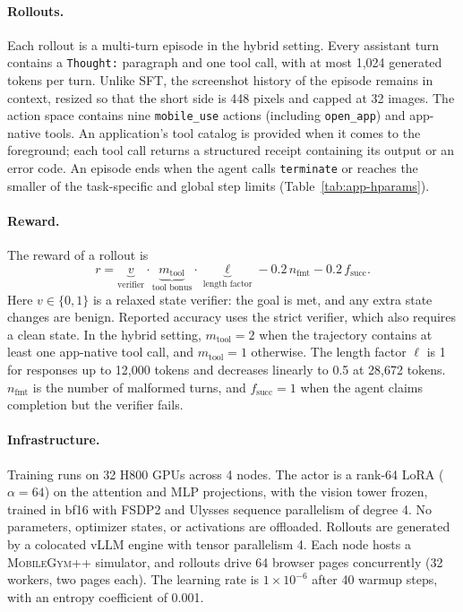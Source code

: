\paragraph{Rollouts.}
Each rollout is a multi-turn episode in the hybrid setting. Every assistant turn contains a \texttt{Thought:} paragraph and one tool call, with at most 1,024 generated tokens per turn. Unlike SFT, the screenshot history of the episode remains in context, resized so that the short side is 448 pixels and capped at 32 images. The action space contains nine \texttt{mobile\_use} actions (including \texttt{open\_app}) and app-native tools. An application's tool catalog is provided when it comes to the foreground; each tool call returns a structured receipt containing its output or an error code. An episode ends when the agent calls \texttt{terminate} or reaches the smaller of the task-specific and global step limits (Table~\ref{tab:app-hparams}).

\paragraph{Reward.}
The reward of a rollout is
\begin{equation*}
r = \underbrace{v}_{\text{verifier}} \cdot \underbrace{m_{\text{tool}}}_{\text{tool bonus}} \cdot \underbrace{\ell}_{\text{length factor}} - 0.2\, n_{\text{fmt}} - 0.2\, f_{\text{succ}}.
\end{equation*}
Here $v\in\{0,1\}$ is a relaxed state verifier: the goal is met, and any extra state changes are benign. Reported accuracy uses the strict verifier, which also requires a clean state. In the hybrid setting, $m_{\text{tool}}=2$ when the trajectory contains at least one app-native tool call, and $m_{\text{tool}}=1$ otherwise. The length factor $\ell$ is 1 for responses up to 12,000 tokens and decreases linearly to 0.5 at 28,672 tokens. $n_{\text{fmt}}$ is the number of malformed turns, and $f_{\text{succ}}=1$ when the agent claims completion but the verifier fails.

\paragraph{Infrastructure.}
Training runs on 32 H800 GPUs across 4 nodes. The actor is a rank-64 LoRA ($\alpha{=}64$) on the attention and MLP projections, with the vision tower frozen, trained in bf16 with FSDP2 and Ulysses sequence parallelism of degree 4. No parameters, optimizer states, or activations are offloaded. Rollouts are generated by a colocated vLLM engine with tensor parallelism 4. Each node hosts a \textsc{MobileGym++} simulator, and rollouts drive 64 browser pages concurrently (32 workers, two pages each). The learning rate is $1\times10^{-6}$ after 40 warmup steps, with an entropy coefficient of 0.001.

